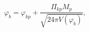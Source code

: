 \begin{equation}\label{PSboundary1}
\varphi_{b}=\varphi_{kp}+\frac{{\Pi}_{kp}M_{p}}{\sqrt{24\pi
V(\varphi_{b})}},
\end{equation}

